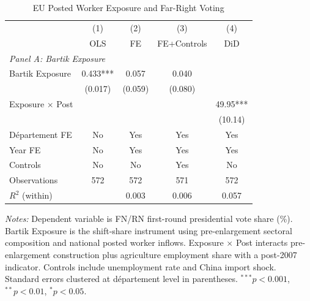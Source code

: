 \begin{table}[htbp]
\centering
\caption{EU Posted Worker Exposure and Far-Right Voting}
\label{tab:main}
\begin{tabular}{lcccc}
\toprule
 & (1) & (2) & (3) & (4) \\
 & OLS & FE & FE+Controls & DiD \\
\midrule
\multicolumn{5}{l}{\textit{Panel A: Bartik Exposure}} \\[3pt]
Bartik Exposure & 0.433*** & 0.057 & 0.040 & \\
 & (0.017) & (0.059) & (0.080) & \\[3pt]
Exposure $\times$ Post & & & & 49.95*** \\
 & & & & (10.14) \\
\midrule
D\'epartement FE & No & Yes & Yes & Yes \\
Year FE & No & Yes & Yes & Yes \\
Controls & No & No & Yes & No \\
Observations & 572 & 572 & 571 & 572 \\
$R^2$ (within) & & 0.003 & 0.006 & 0.057 \\
\bottomrule
\end{tabular}
\begin{tablenotes}[flushleft]\small
\item \textit{Notes:} Dependent variable is FN/RN first-round presidential vote share (\%). Bartik Exposure is the shift-share instrument using pre-enlargement sectoral composition and national posted worker inflows. Exposure $\times$ Post interacts pre-enlargement construction plus agriculture employment share with a post-2007 indicator. Controls include unemployment rate and China import shock. Standard errors clustered at d\'epartement level in parentheses. $^{***}p<0.001$, $^{**}p<0.01$, $^{*}p<0.05$.
\end{tablenotes}
\end{table}
